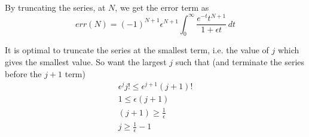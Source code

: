 \documentclass{/home/janmebows/Documents/LatexTemplates/myassignment}
\begin{document}
\begin{enumerate}
\begin{enumerate}
            By truncating the series, at $N$, we get the error term as
            \[err(N) = (-1)^{N+1}\epsilon^{N+1}\int_0^\infty  \frac{e^{-t}t^{N+1} }{1+\epsilon t}\,dt\]
            
            It is optimal to truncate the series at the smallest term, i.e. the value of $j$ which gives the smallest value.
            So want the largest $j$ such that (and terminate the series before the $j+1$ term)
            \begin{align*}
                \epsilon^j j! \leq \epsilon^{j+1} (j+1)!\\
                1 \leq \epsilon (j+1)\\
                (j+1) \geq \frac{1}{\epsilon}\\
                j \geq \frac{1}{\epsilon} - 1
            \end{align*}
            
            
            

\end{enumerate}
\end{enumerate}
\end{document}
